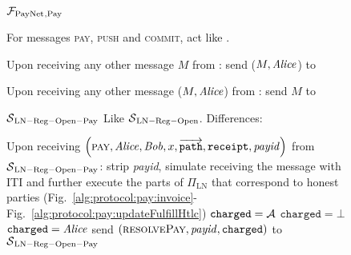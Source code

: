 \begin{figure}[H]
  \begin{systembox}{$\mathcal{F}_{\mathrm{PayNet}}{}_{\mathrm{, Pay}}$}
    \begin{algorithmic}[1]
      \State For messages \textsc{pay}, \textsc{push} and \textsc{commit}, act
      like \fpaynet{}.
      \Statex

      \State Upon receiving any other message $M$ from \alice:
      \Indent
          \State send ($M, \mathit{Alice}$) to \simulator
        \EndIf
      \EndIndent
      \Statex

      \State Upon receiving any other message ($M, \mathit{Alice}$) from \simulator:
      \Indent
          \State send $M$ to \alice
        \EndIf
      \EndIndent
    \end{algorithmic}
  \end{systembox}
  \caption{}
  \label{alg:proof:fpaynet:pay}
\end{figure}

\begin{figure}[H]
  \begin{simulatorbox}{$\mathcal{S}{}_{\mathrm{LN - Reg - Open - Pay}}$}
    Like $\mathcal{S}{}_{\mathrm{LN - Reg - Open}}$. Differences:
    \begin{algorithmic}[1]
      \State Upon receiving $\left(\textsc{pay}, \mathit{Alice}, \mathit{Bob}, x,
      \overrightarrow{\mathtt{path}}, \mathtt{receipt}, \mathit{payid}\right)$
      from $\mathcal{S}{}_{\mathrm{LN - Reg - Open - Pay}}$:
      \Indent
        \State strip \textit{payid}, simulate receiving the message with
        \alice{} ITI and further execute the parts of $\Pi_{\mathrm{LN}}$ that
        correspond to honest parties (Fig.~\ref{alg:protocol:pay:invoice}-
        Fig.~\ref{alg:protocol:pay:updateFulfillHtlc})
        \If{}
          \State $\mathtt{charged} = \mathcal{A}$
         
        \State {}
        \State {}
          \State $\mathtt{charged} = \bot$
        \Else
          \State $\mathtt{charged} = \mathit{Alice}$
        \EndIf
        \State send $\left(\textsc{resolvePay}, \mathit{payid},
        \mathtt{charged}\right)$ to $\mathcal{S}{}_{\mathrm{LN - Reg - Open -
        Pay}}$
      \EndIndent
    \end{algorithmic}
  \end{simulatorbox}
  \caption{}
  \label{alg:sim:pay}
\end{figure}

